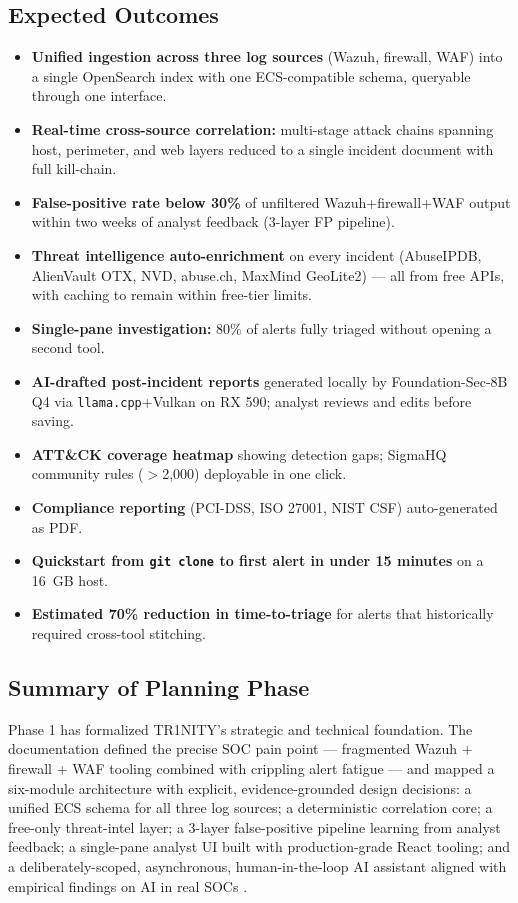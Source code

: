 \documentclass[11pt,a4paper]{article}
\begin{document}
\subsection{Expected Outcomes}

\begin{itemize}[leftmargin=*, itemsep=3pt]
  \item \textbf{Unified ingestion across three log sources} (Wazuh, firewall, WAF) into a single OpenSearch index with one ECS-compatible schema, queryable through one interface.
  \item \textbf{Real-time cross-source correlation:} multi-stage attack chains spanning host, perimeter, and web layers reduced to a single incident document with full kill-chain.
  \item \textbf{False-positive rate below 30\%} of unfiltered Wazuh+firewall+WAF output within two weeks of analyst feedback (3-layer FP pipeline).
  \item \textbf{Threat intelligence auto-enrichment} on every incident (AbuseIPDB, AlienVault OTX, NVD, abuse.ch, MaxMind GeoLite2) — all from free APIs, with caching to remain within free-tier limits.
  \item \textbf{Single-pane investigation:} 80\% of alerts fully triaged without opening a second tool.
  \item \textbf{AI-drafted post-incident reports} generated locally by Foundation-Sec-8B Q4 via \texttt{llama.cpp}+Vulkan on RX 590; analyst reviews and edits before saving.
  \item \textbf{ATT\&CK coverage heatmap} showing detection gaps; SigmaHQ community rules ($>$2{,}000) deployable in one click.
  \item \textbf{Compliance reporting} (PCI-DSS, ISO 27001, NIST CSF) auto-generated as PDF.
  \item \textbf{Quickstart from \texttt{git clone} to first alert in under 15 minutes} on a 16~GB host.
  \item \textbf{Estimated 70\% reduction in time-to-triage} for alerts that historically required cross-tool stitching.
\end{itemize}

\subsection{Summary of Planning Phase}

Phase 1 has formalized TR1NITY's strategic and technical foundation. The documentation defined the precise SOC pain point — fragmented Wazuh + firewall + WAF tooling combined with crippling alert fatigue — and mapped a six-module architecture with explicit, evidence-grounded design decisions: a unified ECS schema for all three log sources; a deterministic correlation core; a free-only threat-intel layer; a 3-layer false-positive pipeline learning from analyst feedback; a single-pane analyst UI built with production-grade React tooling; and a deliberately-scoped, asynchronous, human-in-the-loop AI assistant aligned with empirical findings on AI in real SOCs \cite{darrow2024aisoc}.
\end{document}
